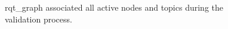 \begin{figure}[ht!]
    \centering
    
    \caption{rqt\_graph associated all active nodes and topics during the validation process.}
    \label{fig:robofuzz_rqt_graph_all_llama_ros-tb3}
\end{figure}